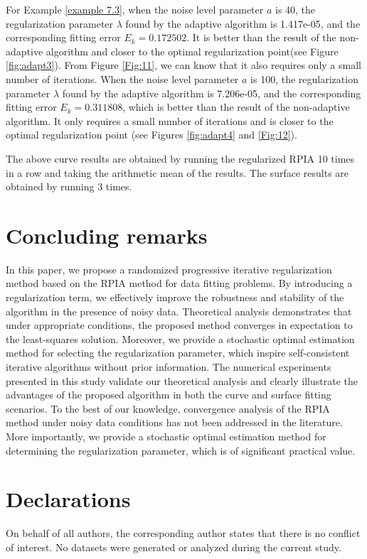 \documentclass[11pt]{article}
\numberwithin{equation}{section}
\begin{document}
For Example \ref{example 7.3},  when the noise level parameter $a$ is 40, the regularization parameter $\lambda$ found by the adaptive algorithm is 1.417e-05, and the corresponding fitting error $E_k= 0.172502$. It is better than the result of the non-adaptive algorithm and closer to the optimal regularization point(see Figure \ref{fig:adapt3}). From Figure \ref{Fig:11}, we can know that it also requires only a small number of iterations.
When the noise level parameter $a$ is 100, the regularization parameter $\lambda$ found by the adaptive algorithm is 7.206e-05, and the corresponding fitting error $E_k=0.311808$, which is better than the result of the non-adaptive algorithm. It only requires a small number of iterations and is closer to the optimal regularization point (see Figures \ref{fig:adapt4} and \ref{Fig:12}).

The above curve results are obtained by running the regularized RPIA 10 times in a row and taking the arithmetic mean of the results. The surface results are obtained by running 3 times.

\section{Concluding remarks}
In this paper, we propose a randomized progressive iterative regularization method based on the RPIA method for data fitting problems. By introducing a regularization term, we effectively improve the robustness and stability of the algorithm in the presence of noisy data. Theoretical analysis demonstrates that under appropriate conditions, the proposed method converges in expectation to the least-squares solution. Moreover, we provide a stochastic optimal estimation method for selecting the regularization parameter, which inspire self-consistent iterative algorithms without prior information. The numerical experiments presented in this study validate our theoretical analysis and clearly illustrate the advantages of the proposed algorithm in both the curve and surface fitting scenarios. To the best of our knowledge, convergence analysis of the RPIA method under noisy data conditions has not been addressed in the literature. More importantly, we provide a stochastic optimal estimation method for determining the regularization parameter, which is of significant practical value.

\section*{Declarations}
On behalf of all authors, the corresponding author states that there is no conflict of interest. No datasets were generated or analyzed during the current study.
\end{document}

